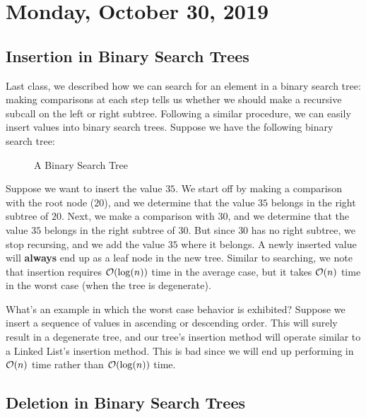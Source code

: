 \section{Monday, October 30, 2019}

\subsection{Insertion in Binary Search Trees}

Last class, we described how we can search for an element in a binary search tree: making comparisons at each step tells us whether we should make a recursive subcall on the left or right subtree. Following a similar procedure, we can easily insert values into binary search trees. Suppose we have the following binary search tree:

\begin{figure}[h]
\centering
{}
\caption{A Binary Search Tree}
\end{figure}

Suppose we want to insert the value $35$. We start off by making a comparison with the root node ($20$), and we determine that the value $35$ belongs in the right subtree of $20$. Next, we make a comparison with $30$, and we determine that the value $35$ belongs in the right subtree of $30$. But since $30$ has no right subtree, we stop recursing, and we add the value $35$ where it belongs. A newly inserted value will \textbf{always} end up as a leaf node in the new tree.  Similar to searching, we note that insertion requires $\mathcal{O}(\log(n))$ time in the average case, but it takes $\mathcal{O}(n)$ time in the worst case (when the tree is degenerate). 

What's an example in which the worst case behavior is exhibited? Suppose we insert a sequence of values in ascending or descending order. This will surely result in a degenerate tree, and our tree's insertion method will operate similar to a Linked List's insertion method. This is bad since we will end up performing in $\mathcal{O}(n)$ time rather than $\mathcal{O}(\log(n))$ time. 

\subsection{Deletion in Binary Search Trees}

